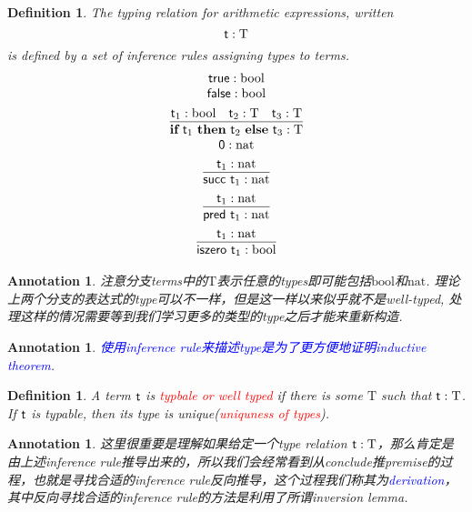 \documentclass{article}
\theoremstyle{plain}
\newtheorem{definition}[theorem]{Definition}
\newtheorem{annotation}[theorem]{Annotation}
\theoremstyle{nonumberplain}
\newcommand{\termtype}[2]{\ensuremath{#1:#2}}
\newcommand{\term}[1]{\ensuremath\mathsf{#1}}
\newcommand{\true}{\term{true}}
\newcommand{\false}{\term{false}}
\newcommand{\ifelse}[3]{\ensuremath{\textbf{if}~#1~\textbf{then}~#2~\textbf{else}~#3}}
\newcommand{\succt}[1]{\term{succ}~#1}
\newcommand{\pred}[1]{\term{pred}~#1}
\newcommand{\iszero}[1]{\term{iszero}~#1}
\newcommand{\redt}[1]{\textcolor{red}{#1}}
\newcommand{\bluet}[1]{\textcolor{blue}{#1}}
\begin{document}
\begin{definition}
\rm The typing relation for arithmetic expressions, written
$$
\termtype{\term{t}}{\text{T}}
$$
is defined by a set of inference rules assigning types to terms.
$$
\begin{array}{c}
\termtype{\true}{\text{bool}} \\
\termtype{\false}{\text{bool}} \\[0.5em]
\infer{\termtype{\ifelse{\term{t}_1}{\term{t}_2}{\term{t}_3}}{\text{T}}}{\termtype{\term{t}_1}{\text{bool}} & \termtype{\term{t}_2}{\text{T}} & \termtype{\term{t}_3}{\text{T}}} \\
\termtype{\term{0}}{\text{nat}} \\[0.5em]
\infer{\termtype{\succt{\term{t}_1}}{\text{nat}}} {\termtype{\term{t}_1}{\text{nat}}}\\[0.5em]
\infer{\termtype{\pred{\term{t}_1}}{\text{nat}}} {\termtype{\term{t}_1}{\text{nat}}}\\[0.5em]
\infer{\termtype{\iszero{\term{t}_1}}{\text{bool}}} {\termtype{\term{t}_1}{\text{nat}}}\\
\end{array} 
$$
\end{definition}

\begin{annotation}
\rm 注意分支terms中的$\text{T}$表示任意的types即可能包括$\text{bool}$和$\text{nat}$. 理论上两个分支的表达式的type可以不一样，但是这一样以来似乎就不是well-typed, 处理这样的情况需要等到我们学习更多的类型的type之后才能来重新构造. 
\end{annotation}

\begin{annotation}
\rm \bluet{使用inference rule来描述type是为了更方便地证明inductive theorem}.
\end{annotation}

\begin{definition}
\rm A term $\term{t}$ is \redt{typbale or well typed} if there is some $\text{T}$ such that $\termtype{\term{t}}{\text{T}}$. If $\term{t}$ is typable, then its type is unique(\redt{uniquness of types}). 
\end{definition}

\begin{annotation}
\rm 这里很重要是理解如果给定一个type relation $\termtype{\term{t}}{\text{T}}$，那么肯定是由上述inference rule推导出来的，所以我们会经常看到从conclude推premise的过程，也就是寻找合适的inference rule反向推导，这个过程我们称其为\bluet{derivation}，其中反向寻找合适的inference rule的方法是利用了所谓inversion lemma. 
\end{annotation}
\end{document}
